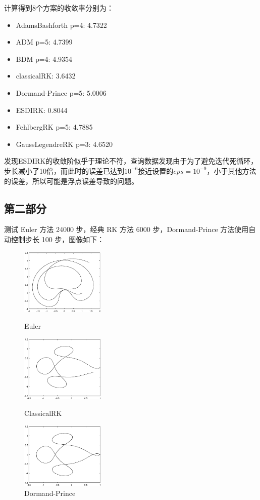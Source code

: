 \documentclass[12]{article}%
\begin{document}
计算得到8个方案的收敛率分别为：
\begin{itemize}
    \item AdamsBashforth p=4: 4.7322
    \item ADM p=5: 4.7399
    \item BDM p=4: 4.9354
    \item classicalRK: 3.6432
    \item Dormand-Prince p=5: 5.0006
    \item ESDIRK: 0.8044
    \item FehlbergRK p=5: 4.7885
    \item GaussLegendreRK p=3: 4.6520
\end{itemize}

发现ESDIRK的收敛阶似乎于理论不符，查询数据发现由于为了避免迭代死循环，步长减小了10倍，而此时的误差已达到$10^{-6}$接近设置的$eps=10^{-9}$，小于其他方法的误差，所以可能是浮点误差导致的问题。

\subsection{第二部分}
测试 Euler 方法 24000 步，经典 RK 方法 6000 步，Dormand-Prince 方法使用自动控制步长 100 步，图像如下：

\begin{figure}[H]
    \centering
    \begin{minipage}[t]{0.3\textwidth}
    \centering
    \includegraphics[width=4cm]{../pic/Euler.eps}
    \caption{Euler}
    \end{minipage}
    \begin{minipage}[t]{0.3\textwidth}
    \centering
    \includegraphics[width=4cm]{../pic/RK6000.eps}
    \caption{ClassicalRK}
    \end{minipage}
    \begin{minipage}[t]{0.3\textwidth}
    \centering
    \includegraphics[width=4cm]{../pic/Dormand-Prince.eps}
    \caption{Dormand-Prince }
    \end{minipage}
\end{figure}
\end{document}
